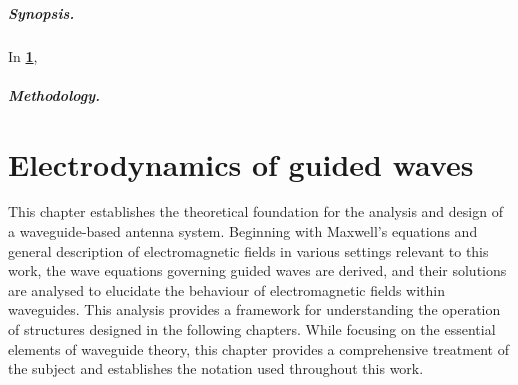 \documentclass[11pt,a4paper,twoside,openany]{report}
\begin{document}

\paragraph*{Synopsis.} In \textbf{\cref{chap:electrodynamics}}, \lipsum[4]

\paragraph*{Methodology.} \lipsum[4]


\chapter{Electrodynamics of guided waves}
\label{chap:electrodynamics}
This chapter establishes the theoretical foundation for the analysis and design of a waveguide-based antenna system. Beginning with Maxwell's equations and general description of electromagnetic fields in various settings relevant to this work, the wave equations governing guided waves are derived, and their solutions are analysed to elucidate the behaviour of electromagnetic fields within waveguides. This analysis provides a framework for understanding the operation of structures designed in the following chapters. While focusing on the essential elements of waveguide theory, this chapter provides a comprehensive treatment of the subject and establishes the notation used throughout this work.
\end{document}
